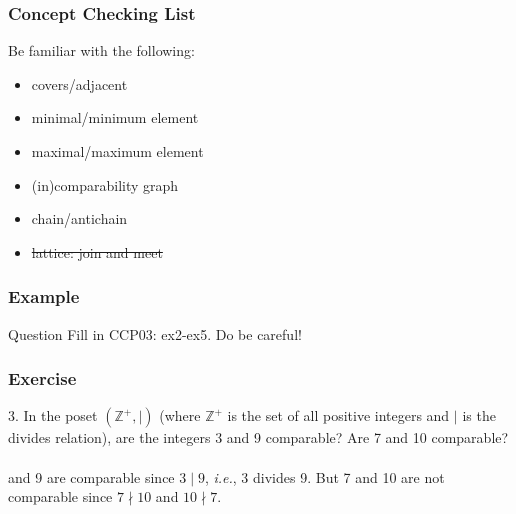 \documentclass{beamer}
\begin{document}
\begin{frame}
    \frametitle{Concept Checking List}
    Be familiar with the following:
    \begin{itemize}
        \item covers/adjacent
        \item minimal/minimum element
        \item maximal/maximum element
        \item (in)comparability graph
        \item chain/antichain
        \item \sout{lattice: join and meet}
    \end{itemize}
    \vv
\end{frame}
\begin{frame}
    \frametitle{Example}
    \begin{block}{Question}
        \hh Fill in CCP03: ex2-ex5. Do be careful!
    \end{block}
\end{frame}
\begin{frame}
    \frametitle{Exercise}
    3. In the poset $(\mathbb{Z}^+, \mid)$ (where $\mathbb{Z}^+$ is the set of 
    all positive integers and $\mid$ is the divides relation), are the integers 3 and 9 comparable? 
    Are 7 and 10 comparable? \\
    \vs{2em}
    \pause
    \\
     and 9 are comparable since $3 \mid 9$, \textit{i.e.}, 
    3 divides 9. But 7 and 10 are not comparable since $7 \nmid 10$  
    and $10 \nmid 7$. 
\end{frame}
\end{document}
